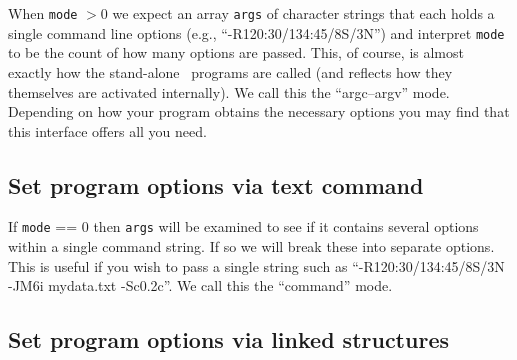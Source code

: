 \documentclass[11pt]{report}
\begin{document}
When \texttt{mode} $> 0$ we expect an array \texttt{args} of character strings that each
holds a single command line options (e.g., ``-R120:30/134:45/8S/3N'') and interpret \texttt{mode}
to be the count of how many options are passed.  This, of course, is almost exactly how the stand-alone \GMT\
programs are called (and reflects how they themselves are activated internally).  We call this the ``argc--argv'' mode.
Depending on how your program obtains the necessary options you may find that this interface offers all you need.

\subsection{Set program options via text command}

If \texttt{mode} == 0 then \texttt{args} will be examined to see if it contains several options within a single command string.
If so we will break these into separate options.  This is useful if you wish to pass a single string such as
``-R120:30/134:45/8S/3N -JM6i mydata.txt -Sc0.2c''.  We call this the ``command'' mode.

\subsection{Set program options via linked structures}
\end{document}
